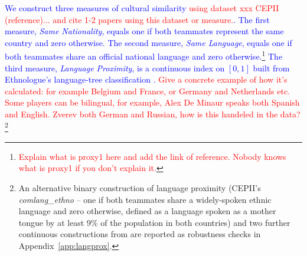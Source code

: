 \documentclass[10pt]{article}
\begin{document}
\textcolor{blue}{We construct three measures of cultural similarity \textcolor{red}{using dataset xxx CEPII (reference)... and cite 1-2 papers using this dataset or measure.}. The first measure, \textit{Same Nationality}, equals one if both teammates represent the same country and zero otherwise. The second measure, \textit{Same Language}, equals one if both teammates share an official national language and zero otherwise.\footnote{\textcolor{red}{Explain what is proxy1 here and  add the link of reference. Nobody knows what is proxy1 if you don't explain it.}} The third measure, \textit{Language Proximity}, is a continuous index on $[0,1]$ built from Ethnologue's language-tree classification \citep{melitztoubal2014}.} \textcolor{red}{Give a concrete example of how it's calculated: for example Belgium and France, or Germany and Netherlands etc. Some players can be bilingual, for example, Alex De Minaur speaks both Spanish and English. Zverev both German and Russian, how is this handeled in the data?}\footnote{An alternative binary construction of language proximity (CEPII's \textit{comlang\_ethno} -- one if both teammates share a widely-spoken ethnic language and zero otherwise, defined as a language spoken as a mother tongue by at least 9\% of the population in both countries) and two further continuous constructions from \citet{psw2024} are reported as robustness checks in Appendix~\ref{app:langprox}.}


\end{document}
